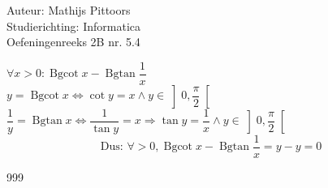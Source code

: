 \documentclass[a4paper]{article}
\newcommand{\Bgcot}{\operatorname{Bgcot}}
\newcommand{\Bgtan}{\operatorname{Bgtan}}
\begin{document}
  
\noindent \large Auteur: Mathijs Pittoors \\
\noindent \large Studierichting: Informatica\\
\noindent \large Oefeningenreeks 2B nr. 5.4\\

\medskip

\normalsize

$\forall x > 0: \Bgcot x - \Bgtan \dfrac{1}{x}$\\

$y = \Bgcot x \Leftrightarrow \cot y = x \wedge y \in \left] 0, \dfrac{\pi}{2} \right[ $\\

$\dfrac{1}{y} = \Bgtan x \Leftrightarrow \dfrac{1}{\tan y} = x \Rightarrow \tan y = \dfrac{1}{x} \wedge y \in \left] 0, \dfrac{\pi}{2}\right[$\\

$$\text{Dus: }\forall > 0, \Bgcot x - \Bgtan \dfrac{1}{x} = y - y = 0$$
\begin{thebibliography}{999}
\end{thebibliography}
\end{document}
